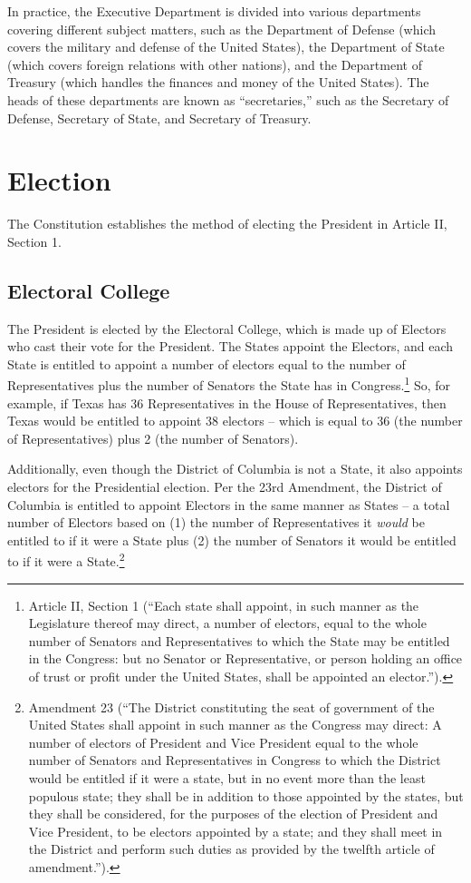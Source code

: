 In practice, the Executive Department is divided into various departments covering different subject matters, such as the Department of Defense (which covers the military and defense of the United States), the Department of State (which covers foreign relations with other nations), and the Department of Treasury (which handles the finances and money of the United States).  The heads of these departments are known as ``secretaries,'' such as the Secretary of Defense, Secretary of State, and Secretary of Treasury.

\section{Election}

The Constitution establishes the method of electing the President in Article II, Section 1.

\subsection{Electoral College}
The President is elected by the Electoral College, which is made up of Electors who cast their vote for the President.  The States appoint the Electors, and each State is entitled to appoint a number of electors equal to the number of Representatives plus the number of Senators the State has in Congress.\footnote{Article II, Section 1 (``Each state shall appoint, in such manner as the Legislature thereof may direct, a number of electors, equal to the whole number of Senators and Representatives to which the State may be entitled in the Congress: but no Senator or Representative, or person holding an office of trust or profit under the United States, shall be appointed an elector.'').}
So, for example, if Texas has 36 Representatives in the House of Representatives, then Texas would be entitled to appoint 38 electors -- which is equal to 36 (the number of Representatives) plus 2 (the number of Senators).

Additionally, even though the District of Columbia is not a State, it also appoints electors for the Presidential election.  Per the 23rd Amendment, the District of Columbia is entitled to appoint Electors in the same manner as States -- a total number of Electors based on (1) the number of Representatives it \textit{would} be entitled to if it were a State plus (2) the number of Senators it would be entitled to if it were a State.\footnote{Amendment 23 (``The District constituting the seat of government of the United States shall appoint in such manner as the Congress may direct: A number of electors of President and Vice President equal to the whole number of Senators and Representatives in Congress to which the District would be entitled if it were a state, but in no event more than the least populous state; they shall be in addition to those appointed by the states, but they shall be considered, for the purposes of the election of President and Vice President, to be electors appointed by a state; and they shall meet in the District and perform such duties as provided by the twelfth article of amendment.'').}

